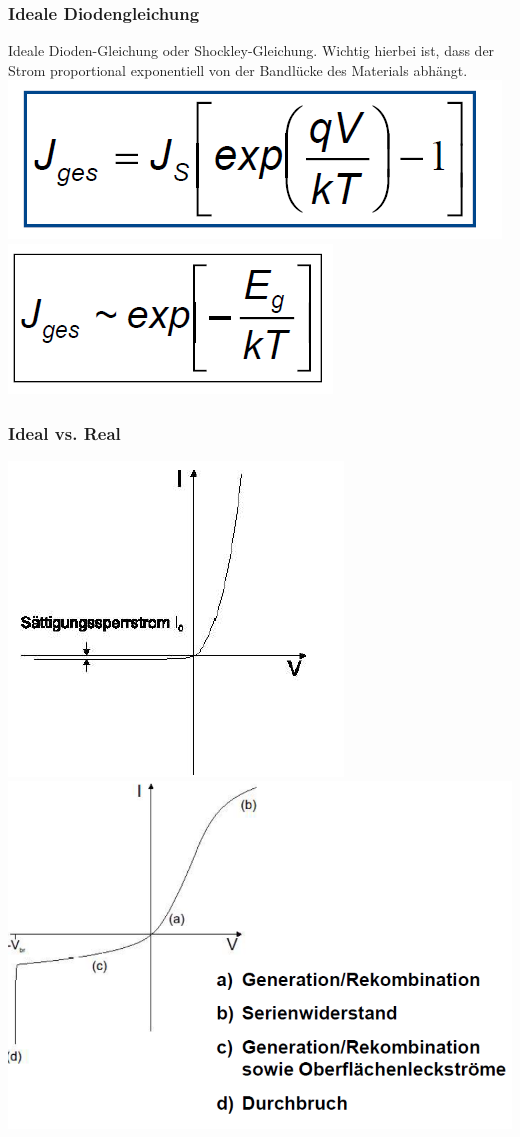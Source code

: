 	\subsubsection{Ideale Diodengleichung}
		\begin{center}
			Ideale Dioden-Gleichung oder Shockley-Gleichung.
			Wichtig hierbei ist, dass der Strom proportional exponentiell von der Bandlücke des Materials abhängt.
			\includegraphics[width=0.3\linewidth]{Kapitel/Kap08/IdealeDiodengleichung.png}
			\includegraphics[width=0.2\linewidth]{Kapitel/Kap08/IdealeDiodengleichungProportionalitaet.png}	
		\end{center}
	
	\subsubsection{Ideal vs. Real}
		\begin{center}
			\includegraphics[width=0.25\linewidth]{Kapitel/Kap08/IdealvsReal.png}
			\includegraphics[width=0.35\linewidth]{Kapitel/Kap08/RealeDiode}
			
		\end{center}

